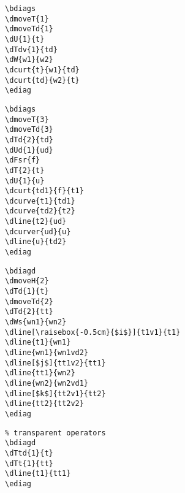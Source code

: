 \documentclass[a4paper]{article}
\begin{document}
 \begin{minipage}[b]{0.5\linewidth}\centering
  \begin{lstlisting}
\bdiags
\dmoveT{1}
\dmoveTd{1}
\dU{1}{t}
\dTdv{1}{td}
\dW{w1}{w2}
\dcurt{t}{w1}{td}
\dcurt{td}{w2}{t}
\ediag
  \end{lstlisting}
 \end{minipage}
 \begin{minipage}[b]{0.5\linewidth}\centering
\bdiags
{}
\ediag
 \end{minipage}

 \begin{minipage}[b]{0.5\linewidth}\centering
  \begin{lstlisting}
\bdiags
\dmoveT{3}
\dmoveTd{3}
\dTd{2}{td}
\dUd{1}{ud}
\dFsr{f}
\dT{2}{t}
\dU{1}{u}
\dcurt{td1}{f}{t1}
\dcurve{t1}{td1}
\dcurve{td2}{t2}
\dline{t2}{ud}
\dcurver{ud}{u}
\dline{u}{td2}
\ediag
  \end{lstlisting}
 \end{minipage}
 \begin{minipage}[b]{0.5\linewidth}\centering
\bdiags
{}
\ediag
 \end{minipage}

 \begin{minipage}[b]{0.5\linewidth}\centering
  \begin{lstlisting}
\bdiagd
\dmoveH{2}
\dTd{1}{t}
\dmoveTd{2}
\dTd{2}{tt}
\dWs{wn1}{wn2}
\dline[\raisebox{-0.5cm}{$i$}]{t1v1}{t1}
\dline{t1}{wn1}
\dline{wn1}{wn1vd2}
\dline[$j$]{tt1v2}{tt1}
\dline{tt1}{wn2}
\dline{wn2}{wn2vd1}
\dline[$k$]{tt2v1}{tt2}
\dline{tt2}{tt2v2}
\ediag
\end{lstlisting}
\end{minipage}
 \begin{minipage}[b]{0.5\linewidth}\centering
\bdiagd
{}
\ediag
\end{minipage}

\begin{minipage}[b]{0.5\linewidth}\centering
 \begin{lstlisting}
% transparent operators
\bdiagd
\dTtd{1}{t}
\dTt{1}{tt}
\dline{t1}{tt1}
\ediag
\end{lstlisting}
\end{minipage}
 \begin{minipage}[b]{0.5\linewidth}\centering
\bdiagd
{}
\ediag
\end{minipage}
\end{document}
